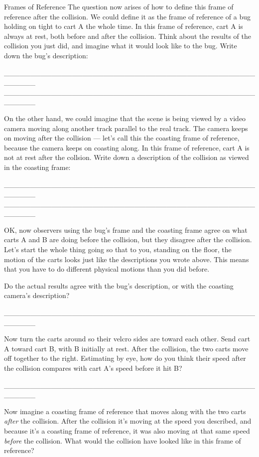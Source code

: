 \begin{lab}{Frames of Reference}
The question now arises of how to define this frame of reference after the collision.
We could define it as the frame of reference of a bug holding on tight to cart A
the whole time. In this frame of reference, cart A is always at rest,
both before and after the collision. Think about the results of the collision you just did, and
imagine what it would look like to the bug. Write down the bug's description:

\newcommand{\smallspaceforwriting}{\_\_\_\_\_\_\_\_\_\_\_\_\_\_\_\_\_\_}
\newcommand{\onelineforwriting}{\_\_\_\_\_\_\_\_\_\_\_\_\_\_\_\_\_\_\_\_\_\_\_\_\_\_\_\_\_\_\_\_\_\_\_\_\_\_\_\_\_\_\_\_\_\_\_\_\_\_\_\_\_\_}
\newcommand{\spaceforwriting}{\onelineforwriting\\ \onelineforwriting}
\spaceforwriting

On the other hand, we could imagine that the scene is being viewed by a video camera
moving along another track parallel to the real track. The camera keeps on moving after
the collision --- let's call this the coasting frame of reference, because the camera
keeps on coasting along. In this frame of reference, cart A is not at rest after the collsion.
Write down a description of the collision as viewed in the coasting frame:

\spaceforwriting

OK, now observers using the bug's frame and the coasting frame agree on what carts A and
B are doing before the collision, but they disagree after the collision.
Let's start the whole thing going so that to you, standing on the floor, the motion of
the carts looks just like the descriptions you wrote above. This means that you have
to do different physical motions than you did before.

Do the actual results agree with the bug's description, or with the coasting camera's
description?

\onelineforwriting


Now turn the carts around so their velcro sides are toward each other.
Send cart A toward cart B, with B initially at rest. After the collision,
the two carts move off together to the right. Estimating by eye, how do you
think their speed after the collision compares with cart A's speed before it hit B?

\onelineforwriting

Now imagine a coasting frame of reference that moves along with the two carts \emph{after}
the collision. After the collision it's moving at the speed you described,
and because it's a coasting frame of reference, it was also moving at that same
speed \emph{before} the collision. What would the collision have looked like
in this frame of reference?


\end{lab}
